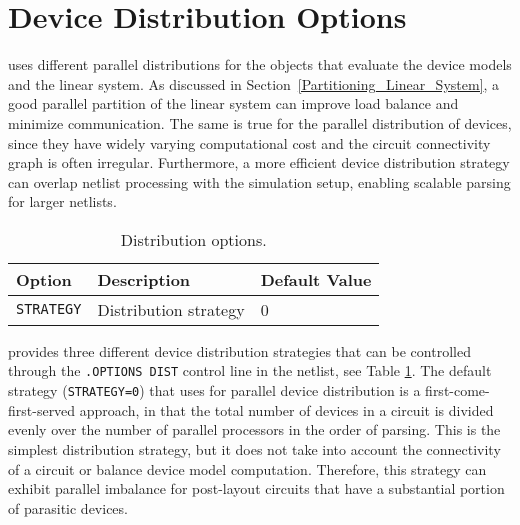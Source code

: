 \section{Device Distribution Options}
\label{Device_Distribution_Options} 
\Xyce{} uses different parallel distributions for the objects that evaluate the
device models and the linear system.  As discussed in Section~\ref{Partitioning_Linear_System}, a good
parallel partition of the linear system can improve load balance and minimize communication. 
The same is true for the parallel distribution of devices, since they have widely varying
computational cost and the circuit connectivity graph is often irregular.  Furthermore, a more efficient
device distribution strategy can overlap netlist processing with the simulation setup, enabling scalable
parsing for larger netlists.

\begin{table}[htp]
\caption[Device Distribution options.]{Distribution options.}
\label{tab:distribution:options}
\begin{center}
\begin{tabular}{| p{3.5cm} | p{6cm} | p{4.5cm} |}
\hline
Option & Description & Default Value \\
\hline
{\tt STRATEGY}        & Distribution strategy & 0 \\
\hline
\end{tabular}
\end{center}
\end{table}

\Xyce{} provides three different device distribution strategies that can be controlled through
the \texttt{.OPTIONS DIST} control line in the netlist,
see Table \ref{tab:distribution:options}.  The default strategy (\texttt{STRATEGY=0}) that \Xyce{} 
uses for parallel device distribution is a first-come-first-served
approach, in that the total number of devices in a circuit is divided evenly over the number
of parallel processors in the order of parsing.  This is the simplest distribution strategy, but
it does not take into account the connectivity of a circuit or balance device model computation.
Therefore, this strategy can exhibit parallel imbalance for post-layout circuits that have a 
substantial portion of parasitic devices.


